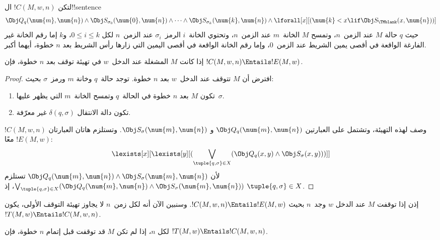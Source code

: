 \documentclass[../../../include/open-logic-section]{subfiles}
\begin{document}
\begin{defn}
لتكن $!C(M,w,n)$ ال!!{sentence}
\[
\Obj Q_q(\num{m}, \num{n}) \land \Obj S_{\sigma_0}(\num{0}, \num{n})
\land \dots \land \Obj S_{\sigma_k}(\num{k}, \num{n}) \land
\lforall[x][(\num{k} < x \lif \Obj S_\TMblank(x, \num{n}))]
\]
حيث $q$ حالة $M$ عند الزمن~$n$، وتمسح $M$ الخانة~$m$ عند الزمن~$n$،
وتحتوي الخانة~$i$ الرمز~$\sigma_i$ عند الزمن~$n$ لكل
$0\le i\le k$، و$k$ إما رقم الخانة غير الفارغة الواقعة في أقصى يمين
الشريط عند الزمن~$0$، وإما رقم الخانة الواقعة في أقصى اليمين التي
زارها رأس الشريط بعد $n$ خطوة، أيهما أكبر.
\end{defn}

\begin{lem}
إذا كانت $M$ المشغلة عند الدخل~$w$ في تهيئة توقف بعد $n$ خطوة، فإن
$!C(M,w,n)\Entails !E(M,w)$.
\end{lem}

\begin{proof}
افترض أن $M$ تتوقف عند الدخل~$w$ بعد $n$ خطوة. توجد حالة~$q$ وخانة
$m$ ورمز~$\sigma$ بحيث:
\begin{enumerate}
\item تكون $M$ بعد $n$ خطوة في الحالة~$q$ وتمسح الخانة~$m$ التي يظهر
  عليها~$\sigma$.
\item تكون دالة الانتقال $\delta(q,\sigma)$ غير معرّفة.
\end{enumerate}
$!C(M,w,n)$ وصف لهذه التهيئة، وتشتمل على العبارتين
$\Obj Q_q(\num{m},\num{n})$ و
$\Obj S_\sigma(\num{m},\num{n})$. وتستلزم هاتان العبارتان معًا
$!E(M,w)$:
\[
\lexists[x][\lexists[y][(\bigvee_{\tuple{q, \sigma} \in
      X}(\Obj Q_q(x, y) \land \Obj S_\sigma(x, y)))]]
\]
لأن $\Obj Q_q(\num{m},\num{n})\land
\Obj S_\sigma(\num{m},\num{n})$ تستلزم
$\bigvee_{\tuple{q,\sigma}\in X}(\Obj Q_q(\num{m},\num{n})\land
\Obj S_\sigma(\num{m},\num{n}))$، إذ
$\tuple{q,\sigma}\in X$.
\end{proof}

\begin{explain}
إذن إذا توقفت $M$ عند الدخل $w$ وجد~$n$ بحيث
$!C(M,w,n)\Entails !E(M,w)$. وسنبين الآن أنه لكل زمن~$n$ لا يجاوز
تهيئة التوقف الأولى، يكون $!T(M,w)\Entails !C(M,w,n)$.
\end{explain}

\begin{lem}
لكل $n$، إذا لم تكن $M$ قد توقفت قبل إتمام $n$ خطوة، فإن
$!T(M,w)\Entails !C(M,w,n)$.
\end{lem}
\end{document}
